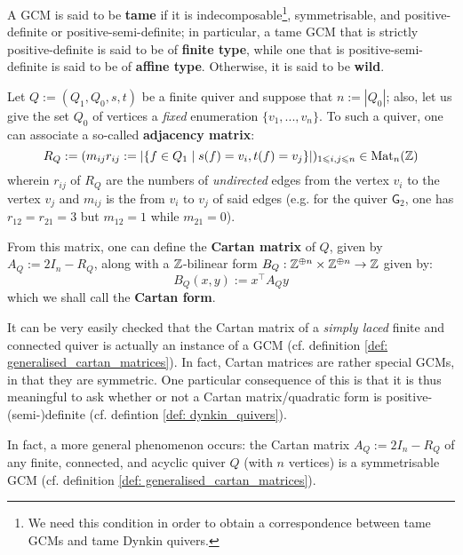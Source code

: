             \begin{definition} \label{def: tame_and_wild_generalised_cartan_matrices}
                A GCM is said to be \textbf{tame} if it is indecomposable\footnote{We need this condition in order to obtain a correspondence between tame GCMs and tame Dynkin quivers.}, symmetrisable, and positive-definite or positive-semi-definite; in particular, a tame GCM that is strictly positive-definite is said to be of \textbf{finite type}, while one that is positive-semi-definite is said to be of \textbf{affine type}. Otherwise, it is said to be \textbf{wild}.
            \end{definition}
            \begin{definition} \label{def: cartan_quadratic_forms_of_finite_quivers}
                Let $Q := (Q_1, Q_0, s, t)$ be a finite quiver and suppose that $n := |Q_0|$; also, let us give the set $Q_0$ of vertices a \textit{fixed} enumeration $\{v_1, ..., v_n\}$. To such a quiver, one can associate a so-called \textbf{adjacency matrix}:
                    $$R_Q := (m_{ij} r_{ij} := |\{f \in Q_1 \mid s(f) = v_i, t(f) = v_j\}|)_{1 \leqslant i, j \leqslant n} \in \mathrm{Mat}_n(\mathbb{Z})$$
                wherein $r_{ij}$ of $R_Q$ are the numbers of \textit{undirected} edges from the vertex $v_i$ to the vertex $v_j$ and $m_{ij}$ is the  from $v_i$ to $v_j$ of said edges (e.g. for the quiver $\mathsf{G}_2$, one has $r_{12} = r_{21} = 3$ but $m_{12} = 1$ while $m_{21} = 0$).
                
                From this matrix, one can define the \textbf{Cartan matrix} of $Q$, given by $A_Q := 2I_n - R_Q$, along with a $\mathbb{Z}$-bilinear form $B_Q: \Z^{\oplus n} \x \Z^{\oplus n} \to \Z$ given by:
                    $$B_Q(x, y) := x^{\top} A_Q y$$
                which we shall call the \textbf{Cartan form}.
            \end{definition}
            \begin{remark} \label{remark: cartan_matrices_of_finite_acyclic_quivers_are_symmetrisable_generalised_cartan_matrices}
                It can be very easily checked that the Cartan matrix of a \textit{simply laced} finite and connected quiver is actually an instance of a GCM (cf. definition \ref{def: generalised_cartan_matrices}). In fact, Cartan matrices are rather special GCMs, in that they are symmetric. One particular consequence of this is that it is thus meaningful to ask whether or not a Cartan matrix/quadratic form is positive-(semi-)definite (cf. defintion \ref{def: dynkin_quivers}).
                
                In fact, a more general phenomenon occurs: the Cartan matrix $A_Q := 2I_n - R_Q$ of any finite, connected, and acyclic quiver $Q$ (with $n$ vertices) is a symmetrisable GCM (cf. definition \ref{def: generalised_cartan_matrices}).
            \end{remark}
            
